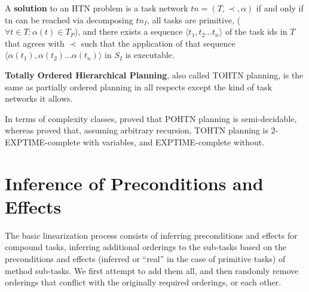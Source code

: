 \documentclass[letterpaper]{article} %
\begin{document}
A \textbf{solution} to an HTN problem is a task network $tn = (T, \prec, \alpha)$ if and only if
tn can be reached via decomposing $tn_I$, all tasks are primitive, ($\forall t \in T: \alpha(t) \in T_P$), and there exists a sequence $\langle t_1, t_2 ... t_n \rangle$ of the task ids in $T$ that agrees with $\prec$ such that the application of that sequence $\langle \alpha(t_1), \alpha(t_2) ... \alpha(t_n) \rangle$ in $S_I$ is executable.



\textbf{Totally Ordered Hierarchical Planning}, also called TOHTN planning, is the same as partially ordered planning in all respects except the kind of task networks it allows.

In terms of complexity classes, \cite{ErolHTNExpressivity} proved that POHTN planning is semi-decidable, whereas \cite{Alford2015TightHTNBounds} proved that, assuming arbitrary recursion, TOHTN planning is 2-EXPTIME-complete with variables, and EXPTIME-complete without. 


\section{Inference of Preconditions and Effects}
The basic linearization process consists of inferring preconditions and effects for compound tasks, inferring additional orderings to the sub-tasks based on the preconditions and effects (inferred or \enquote{real} in the case of primitive tasks) of method sub-tasks. We first attempt to add them all, and then randomly remove orderings that conflict with the originally required orderings, or each other.
 
\end{document}
